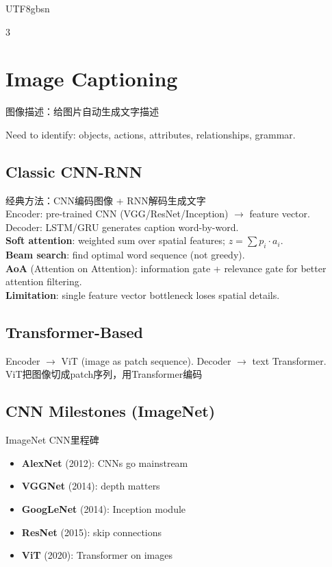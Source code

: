 \documentclass[9pt,landscape,a4paper]{article}
\newcommand{\zhint}[1]{{\scriptsize\color{gray!70!black}#1}}
\begin{document}
\begin{CJK}{UTF8}{gbsn}
\begin{multicols}{3}
\section{Image Captioning}
\zhint{图像描述：给图片自动生成文字描述}

Need to identify: objects, actions, attributes, relationships, grammar.

\subsection{Classic CNN-RNN}
\zhint{经典方法：CNN编码图像 + RNN解码生成文字}\\
Encoder: pre-trained CNN (VGG/ResNet/Inception) $\to$ feature vector.\\
Decoder: LSTM/GRU generates caption word-by-word.\\
\textbf{Soft attention}: weighted sum over spatial features; $z = \sum p_i \cdot a_i$.\\
\textbf{Beam search}: find optimal word sequence (not greedy).\\
\textbf{AoA} (Attention on Attention): information gate + relevance gate for better attention filtering.\\
\textbf{Limitation}: single feature vector bottleneck loses spatial details.

\subsection{Transformer-Based}
Encoder $\to$ ViT (image as patch sequence). Decoder $\to$ text Transformer.\\
\zhint{ViT把图像切成patch序列，用Transformer编码}

\subsection{CNN Milestones (ImageNet)}
\zhint{ImageNet CNN里程碑}
\begin{itemize}[leftmargin=8pt,itemsep=0pt,topsep=0pt]
\item \textbf{AlexNet} (2012): CNNs go mainstream
\item \textbf{VGGNet} (2014): depth matters
\item \textbf{GoogLeNet} (2014): Inception module
\item \textbf{ResNet} (2015): skip connections
\item \textbf{ViT} (2020): Transformer on images
\end{itemize}


\end{multicols}
\end{CJK}
\end{document}
